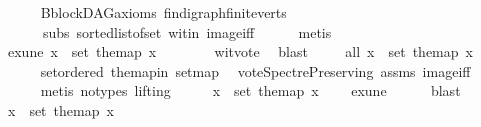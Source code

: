 \begin{isabellebody}
\ \ \ \ \isamarkupfalse%
\ B{\isachardot}{\kern0pt}blockDAG{\isacharunderscore}{\kern0pt}axioms\ fin{\isacharunderscore}{\kern0pt}digraph{\isachardot}{\kern0pt}finite{\isacharunderscore}{\kern0pt}verts\ \isanewline
\ \ \ \ \ \ subs\ sorted{\isacharunderscore}{\kern0pt}list{\isacharunderscore}{\kern0pt}of{\isacharunderscore}{\kern0pt}set{\isacharparenleft}{\kern0pt}{}{\isacharparenright}{\kern0pt}\ wit{\isacharunderscore}{\kern0pt}in\ image{\isacharunderscore}{\kern0pt}iff\isanewline
\ \ \ \ \isamarkupfalse%
\ metis\ \isanewline
\ \ \isamarkupfalse%
\ \isamarkupfalse%
\ exune{\isacharcolon}{\kern0pt}\ {\isachardoublequoteopen}{\isasymexists}x\ {\isasymin}\ set\ the{\isacharunderscore}{\kern0pt}map{\isachardot}{\kern0pt}\ x\ {\isasymnoteq}\ {}{\isachardoublequoteclose}\isanewline
\ \ \ \ \isamarkupfalse%
\ wit{\isacharunderscore}{\kern0pt}vote\ \isamarkupfalse%
\ blast\ \isanewline
\ \ \isamarkupfalse%
\ all{}{}{\isacharcolon}{\kern0pt}\ {\isachardoublequoteopen}{\isasymforall}x\ {\isasymin}\ set\ the{\isacharunderscore}{\kern0pt}map{\isachardot}{\kern0pt}\ x\ {\isasymin}\ {\isacharbraceleft}{\kern0pt}{}{\isacharcomma}{\kern0pt}{}{\isacharbraceright}{\kern0pt}{\isachardoublequoteclose}\ \isanewline
\ \ \ \ \isamarkupfalse%
\ set{\isacharunderscore}{\kern0pt}ordered\ the{\isacharunderscore}{\kern0pt}map{\isacharunderscore}{\kern0pt}in\ set{\isacharunderscore}{\kern0pt}map\ \isamarkupfalse%
\ vote{\isacharunderscore}{\kern0pt}Spectre{\isacharunderscore}{\kern0pt}Preserving\ assms{\isacharparenleft}{\kern0pt}{}{\isacharparenright}{\kern0pt}\ image{\isacharunderscore}{\kern0pt}iff\ \isanewline
\ \ \ \ \isamarkupfalse%
\ {\isacharparenleft}{\kern0pt}metis\ {\isacharparenleft}{\kern0pt}no{\isacharunderscore}{\kern0pt}types{\isacharcomma}{\kern0pt}\ lifting{\isacharparenright}{\kern0pt}{\isacharparenright}{\kern0pt}\isanewline
\ \ \isamarkupfalse%
\ \isamarkupfalse%
\ {\isachardoublequoteopen}{\isasymexists}x\ {\isasymin}\ set\ the{\isacharunderscore}{\kern0pt}map{\isachardot}{\kern0pt}\ x\ {\isacharequal}{\kern0pt}\ {}{\isachardoublequoteclose}\ \isamarkupfalse%
\ exune\isanewline
\ \ \ \ \isamarkupfalse%
\ blast\ \isanewline
\ \ \isamarkupfalse%
\ \isamarkupfalse%
\ {\isachardoublequoteopen}{\isasymexists}x\ {\isasymin}\ set\ the{\isacharunderscore}{\kern0pt}map{\isachardot}{\kern0pt}\ x\ {\isachargreater}{\kern0pt}\ {}{\isachardoublequoteclose}\isanewline

\end{isabellebody}
